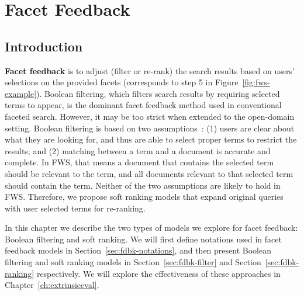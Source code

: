 \chapter{Facet Feedback}
\label{ch:feedback}
\section{Introduction}
\label{sec:fdbk-intro}
\textbf{Facet feedback} is to adjust (filter or re-rank) the search results based on users' selections on the provided facets (corresponds to step 5 in Figure~\ref{fig:fws-example}). Boolean filtering, which filters search results by requiring selected terms to appear, is the dominant facet feedback method used in conventional faceted search. However, it may be too strict when extended to the open-domain setting. Boolean filtering is based on two assumptions~\cite{zhang2010interactive}: (1) users are clear about what they are looking for, and thus are able to select proper terms to restrict the results; and (2) matching between a term and a document is accurate and complete. In FWS, that means a document that contains the selected term should be relevant to the term, and all documents relevant to that selected term should contain the term. Neither of the two assumptions are likely to hold in FWS.
Therefore, we propose soft ranking models that expand original queries with user selected terms for re-ranking.

In this chapter we describe the two types of models we explore for facet feedback: Boolean filtering and soft ranking. We will first define notations used in facet feedback models in Section~\ref{sec:fdbk-notations}, and then present Boolean filtering and soft ranking models in Section~\ref{sec:fdbk-filter} and Section~\ref{sec:fdbk-ranking} respectively.  We will explore the effectiveness of these approaches in Chapter~\ref{ch:extrinsiceval}. 

